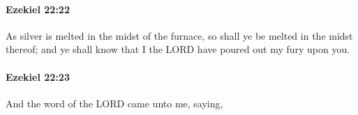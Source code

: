 		\paragraph{Ezekiel 22:22} %
			\label{EZEKIEL-22-22}

			As silver is melted in the midst of the furnace, so shall ye be melted in the midst thereof; and ye shall know that I the LORD have poured out my fury upon you.


		\paragraph{Ezekiel 22:23} %
			\label{EZEKIEL-22-23}

			And the word of the LORD came unto me, saying,


